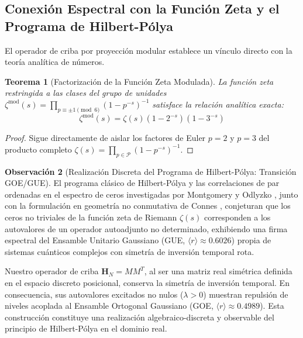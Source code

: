 \documentclass{article}
\numberwithin{equation}{section}
\theoremstyle{plain}
\newtheorem{theorem}{Teorema}[section]
\theoremstyle{definition}
\newtheorem{remark}[theorem]{Observación}
\begin{document}
\subsection{Conexión Espectral con la Función Zeta y el Programa de Hilbert-Pólya}

El operador de criba por proyección modular establece un vínculo directo con la teoría analítica de números.

\begin{theorem}[Factorización de la Función Zeta Modulada]
\label{thm:euleriano-restringido}
La función zeta restringida a las clases del grupo de unidades $\zeta^{\text{mod}}(s) = \prod_{p \equiv \pm 1 \pmod 6} (1 - p^{-s})^{-1}$ satisface la relación analítica exacta:
\begin{equation}
\zeta^{\text{mod}}(s) = \zeta(s) \left(1 - 2^{-s}\right) \left(1 - 3^{-s}\right)
\end{equation}
\end{theorem}

\begin{proof}
Sigue directamente de aislar los factores de Euler $p=2$ y $p=3$ del producto completo $\zeta(s) = \prod_{p \in \mathcal{P}} (1 - p^{-s})^{-1}$.
\end{proof}

\begin{remark}[Realización Discreta del Programa de Hilbert-Pólya: Transición GOE/GUE]
\label{rem:hilbert-polya-goe}
El programa clásico de Hilbert-Pólya y las correlaciones de par ordenadas en el espectro de ceros investigadas por Montgomery y Odlyzko \cite{Montgomery1973, Odlyzko1987}, junto con la formulación en geometría no conmutativa de Connes \cite{Connes1999}, conjeturan que los ceros no triviales de la función zeta de Riemann $\zeta(s)$ corresponden a los autovalores de un operador autoadjunto no determinado, exhibiendo una firma espectral del Ensamble Unitario Gaussiano (GUE, $\langle r \rangle \approx 0.6026$) propia de sistemas cuánticos complejos con simetría de inversión temporal rota.

Nuestro operador de criba $\mathbf{H}_N = M M^T$, al ser una matriz real simétrica definida en el espacio discreto posicional, conserva la simetría de inversión temporal. En consecuencia, sus autovalores excitados no nulos ($\lambda > 0$) muestran repulsión de niveles acoplada al Ensamble Ortogonal Gaussiano (GOE, $\langle r \rangle \approx 0.4989$). Esta construcción constituye una realización algebraico-discreta y observable del principio de Hilbert-Pólya en el dominio real.
\end{remark}
\end{document}
